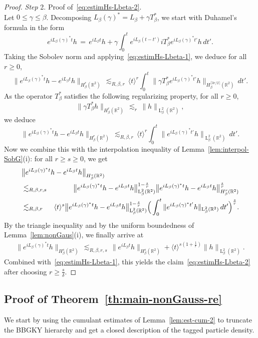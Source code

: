 \documentclass[a4paper,11pt,reqno,noindent]{amsart}
\theoremstyle{plain}
\numberwithin{equation}{section}
\newcommand{\R}{\mathbb R}
\newcommand{\3}{|\!|\!|}
\newcommand{\Ld}{\operatorname{L}}
\newcommand{\step}[1]{\noindent \textit{Step} #1.}
\begin{document}
\begin{proof}
\medskip\noindent
\step2 Proof of~\eqref{eq:estimHs-Lbeta-2}.\\
Let $0\le\gamma\le\beta$. Decomposing $L_\beta(\gamma)^*=L_\beta+\gamma T_\beta^*$, we start with Duhamel's formula in the form
\[e^{iL_\beta(\gamma)^*t}h\,=\,e^{iL_\beta t}h+\gamma\int_0^t e^{iL_\beta(t-t')}iT_\beta^*e^{iL_\beta(\gamma)^*t'}h\,dt'.\]
Taking the Sobolev norm and applying~\eqref{eq:estimHs-Lbeta-1}, we deduce for all $r\ge0$,
\[\big\|e^{iL_\beta(\gamma)^*t}h-e^{iL_\beta t}h\big\|_{H^r_\beta(\R^2)}\,\lesssim_{R,\beta,r}\,\langle t\rangle^r\int_0^t \|\gamma T_\beta^*e^{iL_\beta(\gamma)^*t'}h\|_{H^{\lceil 3r/2\rceil}_\beta(\R^2)}\,dt'.\]
As the operator $T_\beta^*$ satisfies the following regularizing property, for all $r\ge0$,
\[\|\gamma T_\beta^* h\|_{H^r_\beta(\R^2)}\,\lesssim_r\,\|h\|_{\Ld^2_\beta(\R^2)},\]
we deduce
\begin{equation*}
\big\|e^{iL_\beta(\gamma)^*t}h-e^{iL_\beta t}h\big\|_{H^r_\beta(\R^2)}
\,\lesssim_{R,\beta,r}\,\langle t\rangle^r\int_0^t \|e^{iL_\beta(\gamma)^*t'}h\|_{\Ld^2_\beta(\R^2)}\,dt'.
\end{equation*}
Now we combine this with the interpolation inequality of Lemma~\ref{lem:interpol-SobG}(i): for all $r\ge s\ge0$, we get
\begin{eqnarray*}
\lefteqn{\big\|e^{iL_\beta(\gamma)^*t}h-e^{iL_\beta t}h\big\|_{H^s_\beta(\R^2)}}\\
&\lesssim_{R,\beta,r,s}&\big\|e^{iL_\beta(\gamma)^*t}h-e^{iL_\beta t}h\big\|_{\Ld^2_\beta(\R^2)}^{1-\frac sr}\big\|e^{iL_\beta(\gamma)^*t}h-e^{iL_\beta t}h\big\|_{H^r_\beta(\R^2)}^{\frac sr}\\
&\lesssim_{R,\beta,r}&\langle t\rangle^s\big\|e^{iL_\beta(\gamma)^*t}h-e^{iL_\beta t}h\big\|_{\Ld^2_\beta(\R^2)}^{1-\frac sr}\Big(\int_0^t\|e^{iL_\beta(\gamma)^*t'}h\|_{\Ld^2_\beta(\R^2)}\,dt'\Big)^{\frac sr}.
\end{eqnarray*}
By the triangle inequality and by the uniform boundedness of Lemma~\ref{lem:nonGaus}(i), we finally arrive at
\begin{eqnarray*}
\|e^{iL_\beta(\gamma)^*t}h\|_{H^s_\beta(\R^2)}
\,\lesssim_{R,\beta,r,s}\,\|e^{iL_\beta t}h\|_{H^s_\beta(\R^2)}
+\langle t\rangle^{s(1+\frac1r)}\|h\|_{\Ld^2_\beta(\R^2)}.
\end{eqnarray*}
Combined with~\eqref{eq:estimHs-Lbeta-1}, this yields the claim~\eqref{eq:estimHs-Lbeta-2} after choosing $r\ge \frac s\delta$.
\end{proof}
\endgroup

\subsection{Proof of Theorem~\ref{th:main-nonGauss-re}}
We start by using the cumulant estimates of Lemma~\ref{lem:est-cum-2} to truncate the BBGKY hierarchy and get a closed description of the tagged particle density.
\end{document}
